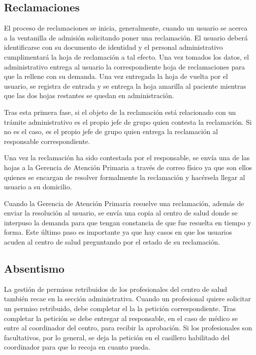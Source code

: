 \subsection{Reclamaciones}

El proceso de reclamaciones se inicia, generalmente, cuando un usuario se acerca a la ventanilla de admisión solicitando poner una reclamación.
El usuario deberá identificarse con su documento de identidad y el personal administrativo cumplimentará la hoja de reclamación a tal efecto.
Una vez tomados los datos, el administrativo entrega al usuario la correspondiente hoja de reclamaciones para que la rellene con su demanda.
Una vez entregada la hoja de vuelta por el usuario, se registra de entrada y se entrega la hoja amarilla al paciente mientras que las dos hojas restantes se quedan en administración.

Tras esta primera fase, si el objeto de la reclamación está relacionado con un trámite administrativo es el propio jefe de grupo quien contesta la reclamación. Si no es el caso, es el propio jefe de grupo quien entrega la reclamación al responsable correspondiente.

Una vez la reclamación ha sido contestada por el responsable, se envía una de las hojas a la Gerencia de Atención Primaria a través de correo físico ya que son ellos quienes se encargan de resolver formalmente la reclamación y hacérsela llegar al usuario a su domicilio.

Cuando la Gerencia de Atención Primaria resuelve una reclamación, además de enviar la resolución al usuario, se envía una copia al centro de salud donde se interpuso la demanda para que tengan constancia de que fue resuelta en tiempo y forma.
Este último paso es importante ya que hay casos en que los usuarios acuden al centro de salud preguntando por el estado de su reclamación.

\subsection{Absentismo}

La gestión de permisos retribuidos de los profesionales del centro de salud también recae en la sección administrativa.
Cuando un profesional quiere solicitar un permiso retribuido, debe completar el la la petición correspondiente.
Tras completar la petición se debe entregar al responsable, en el caso de médico se entre al coordinador del centro, para recibir la aprobación.
Si los profesionales son facultativos, por lo general, se deja la petición en el casillero habilitado del coordinador para que lo recoja en cuanto pueda.

